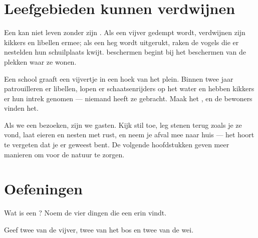 \section{Leefgebieden kunnen verdwijnen}

\begin{proposition}\label{prop:g2:where-animals-live:loss}
Een  kan niet leven zonder zijn . Als een vijver gedempt
wordt, verdwijnen zijn kikkers en libellen ermee; als een heg wordt
uitgerukt, raken de vogels die er nestelden hun schuilplaats kwijt.
 beschermen begint bij het beschermen van de plekken waar ze wonen.
\end{proposition}
\admitted

\begin{example}[De schoolvijver]\label{ex:g2:where-animals-live:schoolpond}
Een school graaft een vijvertje in een hoek van het plein. Binnen twee
jaar patrouilleren er libellen, lopen er schaatsenrijders op het water
en hebben kikkers er hun intrek genomen --- niemand heeft ze gebracht.
Maak het , en de bewoners vinden het.
\end{example}

\begin{remark}\label{rem:g2:where-animals-live:respect}
Als we een  bezoeken, zijn we gasten. Kijk stil toe, leg
stenen terug zoals je ze vond, laat eieren en nesten met rust, en neem
je afval mee naar huis --- het  hoort te vergeten dat je er
geweest bent. De volgende hoofdstukken geven meer manieren om voor de
natuur te zorgen.
\end{remark}

\section{Oefeningen}

\begin{exercise}[$\star$]\label{exo:g2:where-animals-live:1}
Wat is een ? Noem de vier dingen die een  erin vindt.
\end{exercise}

\begin{exercise}[$\star$]\label{exo:g2:where-animals-live:2}
Geef twee  van de vijver, twee van het bos en twee van de wei.
\end{exercise}

